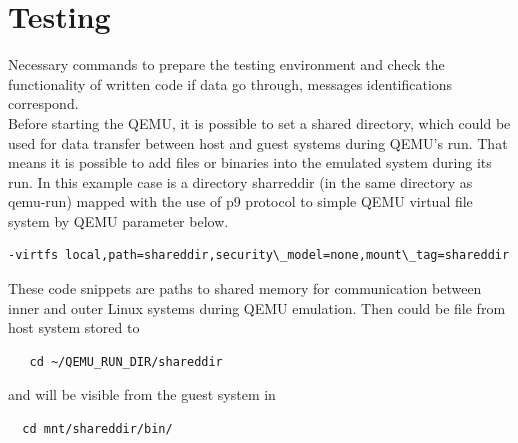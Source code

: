 \documentclass{ctuthesis}
\begin{document}
\chapter{Testing}
 Necessary commands to prepare the testing environment and check the functionality of written code if data go through, messages identifications correspond. \\
 Before starting the QEMU, it is possible to set a shared directory, which could be used for data transfer between host and guest systems during QEMU's run. That means it is possible to add files or binaries into the emulated system during its run. In this example case is a directory sharreddir (in the same directory as qemu-run) mapped with the use of p9 protocol to simple QEMU virtual file system by QEMU parameter below.
\begin{verbatim}-virtfs local,path=shareddir,security\_model=none,mount\_tag=shareddir\end{verbatim}
These code snippets are paths to shared memory for communication between inner and outer Linux systems during QEMU emulation. Then could be file from host system stored to
\begin{verbatim}   cd ~/QEMU_RUN_DIR/shareddir\end{verbatim}
and will be visible from the guest system in
 \begin{verbatim}  cd mnt/shareddir/bin/\end{verbatim}
\end{document}
